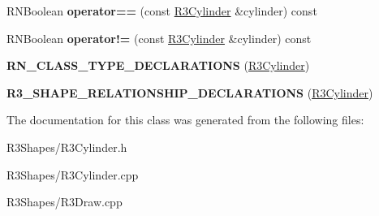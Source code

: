 \begin{DoxyCompactItemize}
\item 
R\+N\+Boolean {\bfseries operator==} (const \hyperlink{class_r3_cylinder}{R3\+Cylinder} \&cylinder) const \hypertarget{class_r3_cylinder_a2015f59fdb62b8d72f11d54d9416e76e}{}\label{class_r3_cylinder_a2015f59fdb62b8d72f11d54d9416e76e}

\item 
R\+N\+Boolean {\bfseries operator!=} (const \hyperlink{class_r3_cylinder}{R3\+Cylinder} \&cylinder) const \hypertarget{class_r3_cylinder_ab06c3455590a4ad96444c525343d2c8a}{}\label{class_r3_cylinder_ab06c3455590a4ad96444c525343d2c8a}

\item 
{\bfseries R\+N\+\_\+\+C\+L\+A\+S\+S\+\_\+\+T\+Y\+P\+E\+\_\+\+D\+E\+C\+L\+A\+R\+A\+T\+I\+O\+NS} (\hyperlink{class_r3_cylinder}{R3\+Cylinder})\hypertarget{class_r3_cylinder_a17cc7c2ee0df53862f35fd121afa4356}{}\label{class_r3_cylinder_a17cc7c2ee0df53862f35fd121afa4356}

\item 
{\bfseries R3\+\_\+\+S\+H\+A\+P\+E\+\_\+\+R\+E\+L\+A\+T\+I\+O\+N\+S\+H\+I\+P\+\_\+\+D\+E\+C\+L\+A\+R\+A\+T\+I\+O\+NS} (\hyperlink{class_r3_cylinder}{R3\+Cylinder})\hypertarget{class_r3_cylinder_aec5c68c5cb265a56e201dd56451b8696}{}\label{class_r3_cylinder_aec5c68c5cb265a56e201dd56451b8696}

\end{DoxyCompactItemize}


The documentation for this class was generated from the following files\+:\begin{DoxyCompactItemize}
\item 
R3\+Shapes/R3\+Cylinder.\+h\item 
R3\+Shapes/R3\+Cylinder.\+cpp\item 
R3\+Shapes/R3\+Draw.\+cpp\end{DoxyCompactItemize}
